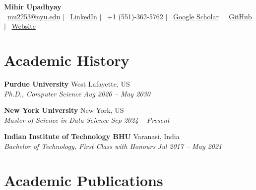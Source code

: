 \documentclass[a4paper,10pt]{article}
\begin{document}
\begin{center}
    {\color{boldcolor}\textbf{\LARGE Mihir Upadhyay}} \\
    \vspace{0.3cm}
    {\scriptsize
    \faEnvelope \, \href{mailto:mu2253@nyu.edu}{\color{boldcolor}mu2253@nyu.edu} 
    \quad $\vert$ \quad
    \faLinkedin \, \href{https://www.linkedin.com/in/mihir-upadhyay-434364171/}{\color{boldcolor}LinkedIn} 
    \quad $\vert$ \quad
    \faPhone \, \color{boldcolor}+1 (551)-362-5762 
    \quad $\vert$ \quad
    \faGraduationCap \, \href{https://scholar.google.com/citations?user=2HXFgKMAAAAJ&hl=en}{\color{boldcolor}Google Scholar} 
    \quad $\vert$ \quad
    \faGithub \, \href{https://github.com/mihirupadhyay}{\color{boldcolor}GitHub} 
    \quad $\vert$ \quad
    \faHome \, \href{https://mihirupadhyay.github.io/}{\color{boldcolor}Website}
    }
    \vspace{0.2cm}
\end{center}

\section*{Academic History}

{\color{boldcolor}\textbf{Purdue University}} \hfill West Lafayette, US  \\  
\small \textit{Ph.D., Computer Science}  \hfill \textit{\small Aug 2026 -- May 2030}\\ 

\vspace{0.08cm}

{\color{boldcolor}\textbf{New York University}} \hfill New York, US  \\  
\small \textit{Master of Science in Data Science}  \hfill \textit{\small Sep 2024 -- Present}\\ 

\vspace{0.08cm}

{\color{boldcolor}\textbf{Indian Institute of Technology BHU}} \hfill Varanasi, India\\
\small \textit{Bachelor of Technology, First Class with Honours} \hfill \textit{\small Jul 2017 -- May 2021}\\
\vspace{-0.4cm}
\section*{Academic Publications}
\end{document}
